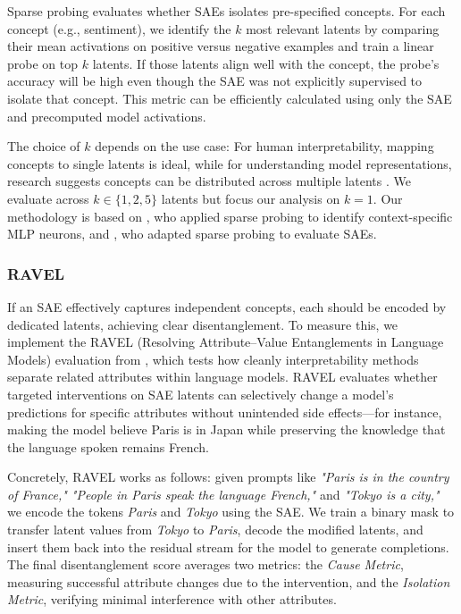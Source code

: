 \documentclass{article}
\theoremstyle{plain}
\theoremstyle{definition}
\theoremstyle{remark}
\begin{document}
Sparse probing evaluates whether SAEs isolates pre-specified concepts. For each concept (e.g., sentiment), we identify the $k$ most relevant latents by comparing their mean activations on positive versus negative examples and train a linear probe on top $k$ latents. If those latents align well with the concept, the probe’s accuracy will be high even though the SAE was not explicitly supervised to isolate that concept. This metric can be efficiently calculated using only the SAE and precomputed model activations.

The choice of $k$ depends on the use case: For human interpretability, mapping concepts to single latents is ideal, while for understanding model representations, research suggests concepts can be distributed across multiple latents \cite{engels2024languagemodelfeatureslinear}. We evaluate across $k \in \{1,2,5\}$ latents but focus our analysis on $k=1$. Our methodology is based on \citet{gurnee2023findingneuronshaystackcase}, who applied sparse probing to identify context-specific MLP neurons, and \citet{gao2024scaling}, who adapted sparse probing to evaluate SAEs.

\subsubsection{RAVEL}

If an SAE effectively captures independent concepts, each should be encoded by dedicated latents, achieving clear disentanglement. To measure this, we implement the RAVEL (Resolving Attribute–Value Entanglements in Language
Models) evaluation from \citet{huang2024ravelevaluatinginterpretabilitymethods}, which tests how cleanly interpretability methods separate related attributes within language models. RAVEL evaluates whether targeted interventions on SAE latents can selectively change a model’s predictions for specific attributes without unintended side effects—for instance, making the model believe Paris is in Japan while preserving the knowledge that the language spoken remains French.

Concretely, RAVEL works as follows: given prompts like \textit{"Paris is in the country of France," "People in Paris speak the language French,"} and \textit{"Tokyo is a city,"} we encode the tokens \textit{Paris} and \textit{Tokyo} using the SAE. We train a binary mask to transfer latent values from \textit{Tokyo} to \textit{Paris}, decode the modified latents, and insert them back into the residual stream for the model to generate completions. The final disentanglement score averages two metrics: the \textit{Cause Metric}, measuring successful attribute changes due to the intervention, and the \textit{Isolation Metric}, verifying minimal interference with other attributes.
\end{document}
